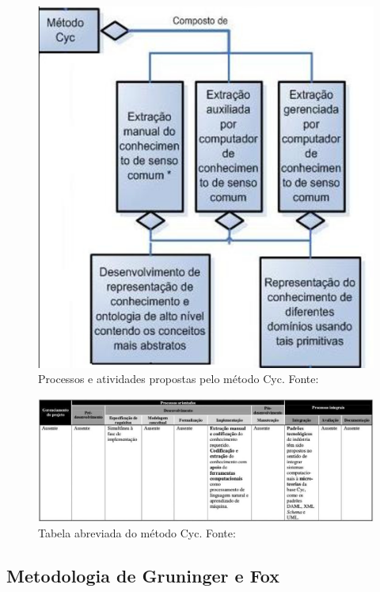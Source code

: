 \begin{figure}[h] 
\centering 
\includegraphics[scale=0.6]{Figuras/1.png} 
\caption[Processos e atividades propostas pelo método Cyc]
{Processos e atividades propostas pelo método Cyc. Fonte: \cite{DanielaLucas2008}}
\label{fig:processos_cyc}
\end{figure}

\pagebreak

\begin{figure}[h] 
\centering 
\includegraphics[scale=0.3]{Figuras/2.png}
\caption[Tabela abreviada do método Cyc]{Tabela abreviada do método Cyc. Fonte: \cite{DanielaLucas2008}}
\end{figure}

\subsection{Metodologia de Gruninger e Fox}    

